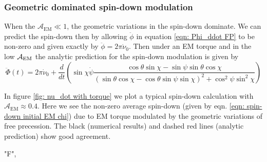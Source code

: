\documentclass[/home/greg/Thesis/main/main.tex]{subfiles}
\begin{document}
\subsubsection{Geometric dominated spin-down modulation}
When the $\mathcal{A}_{\mathrm{EM}} \ll 1$, the geometric variations
in the spin-down dominate. We can predict the spin-down then by allowing 
$\ddot{\phi}$ in equation \eqref{eqn: Phi_ddot FP} to be non-zero and given
exactly by $\ddot{\phi} = 2\pi \dot{\nu}_{0}$. Then under an EM torque and 
in the low $\mathcal{A}_{\mathrm{EM}}$ the analytic prediction for the spin-down modulation is
given by 
\begin{equation}
    \ddot{\Phi}(t) = 2\pi \dot{\nu}_{0} + \frac{d}{dt}\left(
        \sin\chi\dot{\psi} \frac{\cos\theta\sin\chi - \sin \psi \sin \theta \cos\chi 
}{(\sin\theta \cos \chi - \cos \theta \sin \psi \sin \chi)^{2} + \cos^{2}\psi \sin^{2} \chi}
\right)
\label{eqn: 1238}
\end{equation}

In figure \ref{fig: nu_dot with torque} we plot a typical spin-down calculation
with $\mathcal{A}_{\mathrm{EM}} \approx 0.4$. Here we see  
the non-zero average spin-down (given by eqn. \eqref{eqn: spin-down initial EM chi})
due to EM torque modulated by the geometric variations of free precession. The
black (numerical results) and dashed red lines (analytic prediction) show good agreement.

"F",
\FloatBarrier
\end{document}
